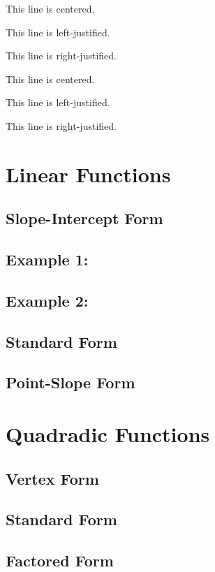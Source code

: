 \documentclass[11pt]{article}
\begin{document}
\vspace{1cm}

\begin{center}
    This line is centered.
\end{center}

\begin{flushleft}
    This line is left-justified.
\end{flushleft}

\begin{flushright}
    This line is right-justified.
\end{flushright}

\tiny
This line is centered.

This line is left-justified.

This line is right-justified.

\pagebreak

\section{Linear Functions}
\subsection{Slope-Intercept Form}
\subsection{Example 1:}
\subsection{Example 2:}
\subsection{Standard Form}
\subsection{Point-Slope Form}
\section{Quadradic Functions}
\subsection{Vertex Form}
\subsection{Standard Form}
\subsection{Factored Form}
\end{document}
